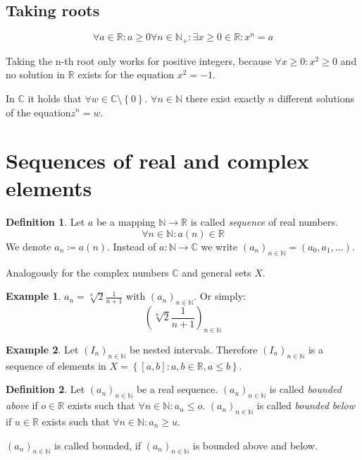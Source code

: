 \documentclass[a4paper,landscape,twocolumn]{article}
\theoremstyle{definition}
\newtheorem{defi}{Definition}
\newtheorem{ex}{Example}
\newcommand\set[1]{\left\{#1\right\}}
\begin{document}
\subsection{Taking roots}
%
\[ \forall a \in \mathbb R: a \geq 0 \forall n \in \mathbb N_+: \exists x \geq 0 \in \mathbb R: x^n = a \]

Taking the n-th root only works for positive integers, because $\forall x \geq 0: x^2 \geq 0$
and no solution in $\mathbb R$ exists for the equation $x^2 = -1$.

In $\mathbb C$ it holds that $\forall w \in \mathbb C \setminus \set{0}$.
$\forall n \in \mathbb N$ there exist exactly $n$ different solutions of the equation$ z^n = w$.

\section{Sequences of real and complex elements}
\begin{defi}
  Let $a$ be a mapping $\mathbb N \rightarrow \mathbb R$ is called \emph{sequence} of real numbers.
  \[ \forall n \in \mathbb N: a(n) \in \mathbb R \]
  We denote $a_n \coloneqq a(n)$.
  Instead of $a: \mathbb N \rightarrow \mathbb C$ we write $(a_n)_{n \in \mathbb N} = (a_0, a_1, \ldots)$.

  Analogously for the complex numbers $\mathbb C$ and general sets $X$.
\end{defi}

\begin{ex}
  $a_n = \sqrt[n]{2} \frac{1}{n + 1}$ with $(a_n)_{n \in \mathbb N}$. Or simply:
  \[ \left(\sqrt[n]{2}\frac{1}{n + 1}\right)_{n \in \mathbb N} \]
\end{ex}

\begin{ex}
  Let $(I_n)_{n \in \mathbb N}$ be nested intervals.
  Therefore $(I_n)_{n \in \mathbb N}$ is a sequence of elements in $X = \set{[a,b]: a,b \in \mathbb R, a \leq b}$.
\end{ex}

\begin{defi}
  Let $(a_n)_{n \in \mathbb N}$ be a real sequence.
  $(a_n)_{n \in \mathbb N}$ is called \emph{bounded above} if $o \in \mathbb R$ exists such that $\forall n \in \mathbb N: a_n \leq o$.
  $(a_n)_{n \in \mathbb N}$ is called \emph{bounded below} if $u \in \mathbb R$ exists such that $\forall n \in \mathbb N: a_n \geq u$.

  $(a_n)_{n \in \mathbb N}$ is called bounded, if $(a_n)_{n \in \mathbb N}$ is bounded above and below.
\end{defi}
\end{document}
